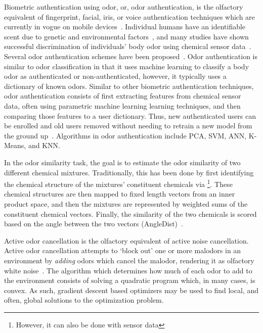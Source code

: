 Biometric authentication using odor, or, odor authentication, is the olfactory
equivalent of fingerprint, facial, iris, or voice authentication techniques
which are currently in vogue on mobile devices~\cite{stokkenes2016biometric}.
Individual humans have an identifiable scent due to genetic and environmental
factors~\cite{penn2007individual}, and many studies have shown successful
discrimination of individuals' body odor using chemical sensor
data~\cite{wongchoosuk2009detection, jha2015quick, jha2016gc}. Several odor
authentication schemes have been proposed~\cite{yang2018human,
shu2014identification}. Odor authentication is similar to odor classification
in that it uses machine learning to classify a body odor as authenticated or
non-authenticated, however, it typically uses a dictionary of known odors.
Similar to other biometric authentication techniques, odor authentication
consists of first extracting features from chemical sensor data, often using
parametric machine learning learning techniques, and then comparing those
features to a user dictionary. Thus, new authenticated users can be enrolled
and old users removed without needing to retrain a new model from the ground
up~\cite{wong2001enhanced}. Algorithms in odor authentication include PCA, SVM,
ANN, K-Means, and KNN.

In the odor similarity task, the goal is to estimate the odor similarity of two
different chemical mixtures.  Traditionally, this has been done by first
identifying the chemical structure of the mixtures' constituent chemicals via
\gcms{}\footnote{However, it can also be done with sensor data}.  These
chemical structures are then mapped to fixed length vectors from an inner
product space, and then the mixtures are represented by weighted sums of the
constituent chemical vectors.  Finally, the similarity of the two chemicals is
scored based on the angle between the two vectors
(AngleDist)~\cite{snitz2013predicting}.

Active odor cancellation is the olfactory equivalent of active noise
cancellation.  Active odor cancellation attempts to `block out' one or more
malodors in an environment by \textit{adding} odors which cancel the malodor,
rendering it as olfactory white noise~\cite{varshney2014active}.
The algorithm which determines how much of each odor to add to the environment
consists of solving a quadratic program which, in many cases, is convex. As
such, gradient descent based optimizers may be used to find local, and often,
global solutions to the optimization problem.

